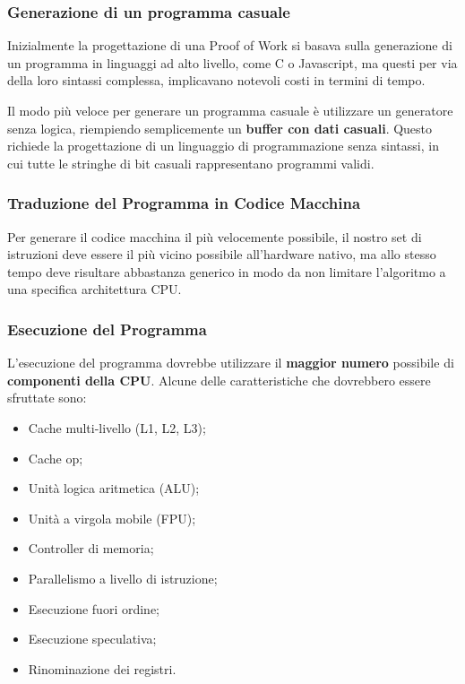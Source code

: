 \subsubsection{Generazione di un programma casuale}
Inizialmente la progettazione di una Proof of Work si basava sulla generazione di un programma in linguaggi ad alto livello, come C o Javascript, ma questi per via della loro sintassi complessa, implicavano notevoli costi in termini di tempo.

Il modo più veloce per generare un programma casuale è utilizzare un generatore senza logica, riempiendo semplicemente un \textbf{buffer con dati casuali}. Questo richiede la progettazione di un linguaggio di programmazione senza sintassi, in cui tutte le stringhe di bit casuali rappresentano programmi validi.

\subsubsection{Traduzione del Programma in Codice Macchina}
Per generare il codice macchina il più velocemente possibile, il nostro set di istruzioni deve essere il più vicino possibile all'hardware nativo, ma allo stesso tempo deve risultare abbastanza generico in modo da non limitare l'algoritmo a una specifica architettura CPU.

\subsubsection{Esecuzione del Programma}
L'esecuzione del programma dovrebbe utilizzare il \textbf{maggior numero} possibile di \textbf{componenti della CPU}. Alcune delle caratteristiche che dovrebbero essere sfruttate sono:
\begin{itemize}
    \item Cache multi-livello (L1, L2, L3);
    \item Cache  \textmu op;
    \item Unità logica aritmetica (ALU);
    \item Unità a virgola mobile (FPU);
    \item Controller di memoria;
    \item Parallelismo a livello di istruzione;
    \item Esecuzione fuori ordine;
    \item Esecuzione speculativa;
    \item Rinominazione dei registri.
\end{itemize}

